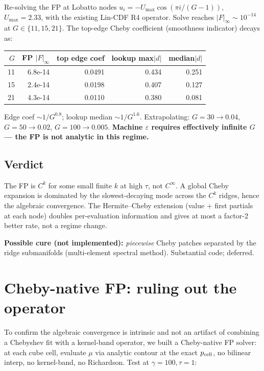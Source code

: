 \documentclass[11pt]{article}
\begin{document}
Re-solving the FP at Lobatto nodes
$u_i = -U_{\max} \cos(\pi i / (G-1))$, $U_{\max} = 2.33$, with the
existing Lin-CDF R4 operator. Solve reaches $|F|_\infty \sim 10^{-14}$
at $G \in \{11, 15, 21\}$. The top-edge Cheby coefficient (smoothness
indicator) decays as:

\begin{center}\begin{tabular}{rrrrr}\toprule
$G$ & FP $|F|_\infty$ & top edge coef & lookup max$|d|$ & median$|d|$ \\
\midrule
11 & 6.8e-14 & 0.0491 & 0.434 & 0.251 \\
15 & 2.4e-14 & 0.0198 & 0.407 & 0.127 \\
21 & 4.3e-14 & 0.0110 & 0.380 & 0.081 \\
\bottomrule\end{tabular}\end{center}

Edge coef $\sim 1/G^{0.8}$; lookup median $\sim 1/G^{1.6}$. Extrapolating:
$G{=}30 \to 0.04$, $G{=}50 \to 0.02$, $G{=}100 \to 0.005$. \textbf{Machine
$\varepsilon$ requires effectively infinite $G$ --- the FP is not analytic
in this regime.}

\subsection{Verdict}

The FP is $C^k$ for some small finite $k$ at high $\tau$, not $C^\infty$.
A global Cheby expansion is dominated by the slowest-decaying mode across
the $C^k$ ridges, hence the algebraic convergence. The Hermite--Cheby
extension (value + first partials at each node) doubles per-evaluation
information and gives at most a factor-2 better rate, not a regime change.

\textbf{Possible cure (not implemented):} \emph{piecewise} Cheby
patches separated by the ridge submanifolds (multi-element spectral
method). Substantial code; deferred.

\section{Cheby-native FP: ruling out the operator}

To confirm the algebraic convergence is intrinsic and not an artifact of
combining a Chebyshev fit with a kernel-band operator, we built a
Cheby-native FP solver: at each cube cell, evaluate $\mu$ via analytic
contour at the exact $p_{\rm cell}$, no bilinear interp, no kernel-band,
no Richardson. Test at $\gamma{=}100, \tau{=}1$:
\end{document}
